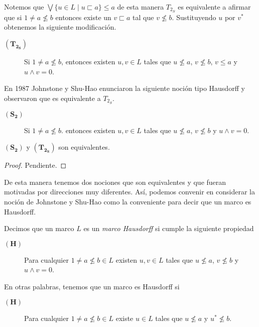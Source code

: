\documentclass{comunicaciones}
\begin{document}
Notemos que $\bigvee\{u\in L\mid u\sqsubset a\}\leq a$ de esta manera $T_{2_S}$ es equivalente a afirmar que si $1\neq a\nleq b$ entonces existe un $v\sqsubset a$ tal que $v\nleq b$. Sustituyendo $u$ por $v^*$ obtenemos la siguiente modificación.

\begin{description}
    \item[$\mathbf{(T_{2_S})}$] Si $1\neq a\nleq b$, entonces existen $u, v\in L$ tales que $u\nleq a$, $v\nleq b$, $v\leq a$ y $u\wedge v=0$. 
\end{description}

En 1987 Johnstone y Shu-Hao enunciaron la siguiente noción tipo Hausdorff y observaron que es equivalente a $T_{2_S}$.

\begin{description}
    \item[$\mathbf{(S_2)}$] Si $1\neq a\nleq b$. entonces existen $u, v\in L$ tales que $u\nleq a$, $v\nleq b$ y $u\wedge v=0$. 
\end{description}

\begin{prop}\label{Proposicion3.3.1}
    $\mathbf{(S_2)}$ y $\mathbf{(T_{2_S})}$ son equivalentes.
\end{prop}

\begin{proof}
    Pendiente.
\end{proof}

De esta manera tenemos dos nociones que son equivalentes y que fueran motivadas por direcciones muy diferentes. Así, podemos convenir en considerar la noción de Johnstone y Shu-Hao como la conveniente para decir que un marco es Hausdorff.

\begin{dfn}\label{MarcoHausdorff}
    Decimos que un marco $L$ es un \emph{marco Hausdorff} si cumple la siguiente propiedad
    \begin{description}
        \item[$\mathbf{(H)}$] Para cualquier $1\neq a\nleq b\in L$ existen $u, v\in L$ tales que $u\nleq a$, $v\nleq b$ y $u\wedge v=0$. 
    \end{description}
\end{dfn}
En otras palabras, tenemos que un marco es Hausdorff si
\begin{description}
    \item[$\mathbf{(H)}$]  Para cualquier $1\neq a\nleq b\in L$ existe $u\in L$ tales que $u\nleq a$ y $u^*\nleq b$. 
\end{description}
\end{document}
